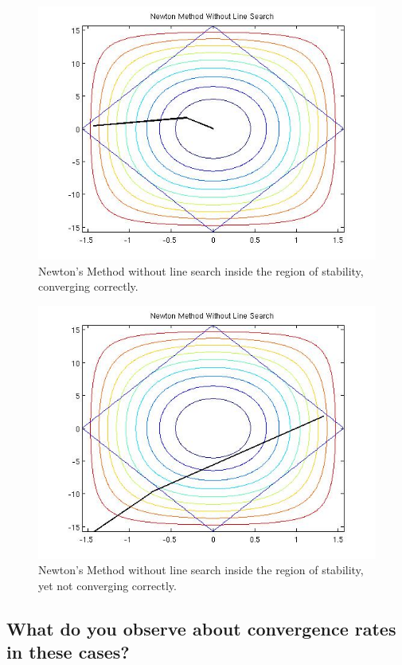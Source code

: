 \documentclass{article}
\begin{document}
\begin{figure}[!htb]
  \includegraphics[scale=.5]{figs/P1NMNLSwin.jpg}
  \caption{Newton's Method without line search inside the region of
 stability, converging correctly.}   
\end{figure}

\begin{figure}[!htb]
  \includegraphics[scale=.5]{figs/P1NMNLSFailinside.jpg}
  \caption{Newton's Method without line search inside the region of
 stability, yet not converging correctly.}   
\end{figure}

\subsection{What do you observe about convergence rates in these cases?} 
\end{document}
